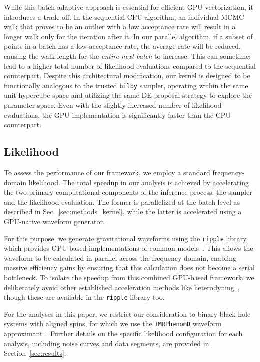 \documentclass[fleqn,usenatbib]{mnras}
\begin{document}
While this batch-adaptive approach is essential for efficient GPU
vectorization, it introduces a trade-off. In the sequential CPU
algorithm, an individual MCMC walk that proves to be an outlier with a low acceptance rate
will result in a longer walk only for the iteration after it. In our parallel algorithm, if a subset of points
in a batch has a low acceptance rate, the average rate will be reduced,
causing the walk length for the \textit{entire next batch} to increase.
This can sometimes lead to a higher total number of likelihood
evaluations compared to the sequential counterpart. Despite this
architectural modification, our kernel is designed to be functionally
analogous to the trusted \texttt{bilby} sampler, operating within the
same unit hypercube space and utilizing the same DE proposal strategy
to explore the parameter space. Even with the slightly increased number of likelihood evaluations,
the GPU implementation is significantly faster than the CPU counterpart.

\subsection{Likelihood}

To assess the performance of our framework, we employ a standard
frequency-domain likelihood. The total
speedup in our analysis is achieved by accelerating the two primary
computational components of the inference process: the sampler and the
likelihood evaluation. The former is parallelized at the batch level as
described in Sec.~\ref{sec:methods_kernel}, while the latter is
accelerated using a GPU-native waveform generator.

For this purpose, we generate gravitational waveforms using the
\texttt{ripple} library, which provides GPU-based implementations of
common models~\citep{ripple}. This allows the waveform to be calculated
in parallel across the frequency domain, enabling massive efficiency gains by 
ensuring that this calculation does not become a serial bottleneck.
To isolate the speedup from this combined GPU-based framework,
we deliberately avoid other established acceleration methods like 
heterodyning~\citep{TL_relativebinning, relativebinning2, relativebinning3, relativebinning4}, 
though these are available in the \texttt{ripple} library too.

For the analyses in this paper, we restrict our consideration to binary
black hole systems with aligned spins, for which we use the
\texttt{IMRPhenomD} waveform approximant~\citep{Khan:2015jqa}.
Further details on the specific likelihood configuration for each
analysis, including noise curves and data segments, are provided in Section~\ref{sec:results}.
\end{document}
